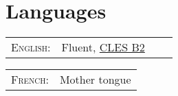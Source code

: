 \documentclass[a4paper,10pt]{article} %
\begin{document}




\section{Languages}

\begin{tabular}{rlrl}
\textsc{English:}   & Fluent, \href{http://www.certification-cles.fr}{CLES B2}\\
\end{tabular}
\hfill
\begin{tabular}{rl}
\textsc{French:}    & Mother tongue\\
\end{tabular}


\end{document}
